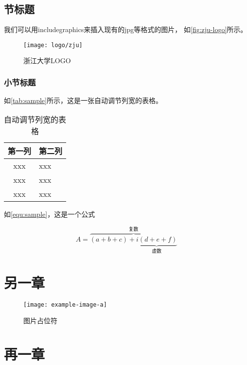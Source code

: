 \section{节标题}

我们可以用includegraphics来插入现有的jpg等格式的图片，
如\autoref{fig:zju-logo}所示。

\begin{figure}[htbp]
    \centering
    \texttt{[image: logo/zju]}
    \caption{\label{fig:zju-logo}浙江大学LOGO}
\end{figure}


\subsection{小节标题}


\par 如\autoref{tab:sample}所示，这是一张自动调节列宽的表格。

\begin{table}[htbp]
    \caption{\label{tab:sample}自动调节列宽的表格}
    \begin{tabularx}{\linewidth}{c|X<{\centering}}
        \hline
        第一列 & 第二列 \\ \hline
        xxx & xxx \\ \hline
        xxx & xxx \\ \hline
        xxx & xxx \\ \hline
    \end{tabularx}
\end{table}


\par 如\autoref{equ:sample}，这是一个公式

\begin{equation}
    \label{equ:sample}
    A=\overbrace{(a+b+c)+\underbrace{i(d+e+f)}_{\text{虚数}}}^{\text{复数}}
\end{equation}

\chapter{另一章}


\begin{figure}[htbp]
    \centering
    \texttt{[image: example-image-a]}
    \caption{\label{fig:fig-placeholder}图片占位符}
\end{figure}

\chapter{再一章}

